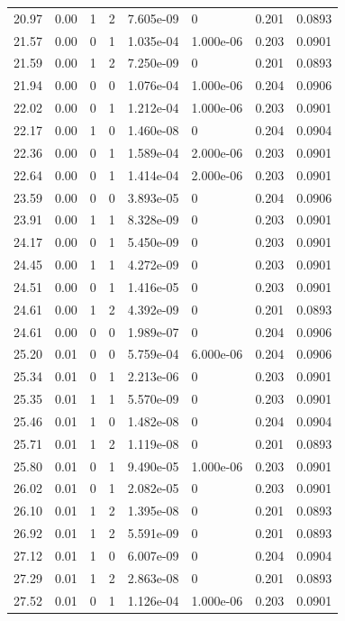 \documentclass[preview]{standalone}
\begin{document}
{{{\begin{tabular}{L{1.2cm}C{1.2cm} C{0.3cm}C{0.5cm} C{1.4cm}C{1.4cm} C{1.4cm}C{1.4cm}}
  20.97  &  0.00  & 1     &  2 &  7.605e-09  & 0  & 0.201 &  0.0893   \\ 
  21.57  &  0.00  & 0     &  1 &  1.035e-04  & 1.000e-06  & 0.203 &  0.0901   \\ 
  21.59  &  0.00  & 1     &  2 &  7.250e-09  & 0  & 0.201 &  0.0893   \\ 
  21.94  &  0.00  & 0     &  0 &  1.076e-04  & 1.000e-06  & 0.204 &  0.0906   \\ 
  22.02  &  0.00  & 0     &  1 &  1.212e-04  & 1.000e-06  & 0.203 &  0.0901   \\ 
  22.17  &  0.00  & 1     &  0 &  1.460e-08  & 0  & 0.204 &  0.0904   \\ 
  22.36  &  0.00  & 0     &  1 &  1.589e-04  & 2.000e-06  & 0.203 &  0.0901   \\ 
  22.64  &  0.00  & 0     &  1 &  1.414e-04  & 2.000e-06  & 0.203 &  0.0901   \\ 
  23.59  &  0.00  & 0     &  0 &  3.893e-05  & 0  & 0.204 &  0.0906   \\ 
  23.91  &  0.00  & 1     &  1 &  8.328e-09  & 0  & 0.203 &  0.0901   \\ 
  24.17  &  0.00  & 0     &  1 &  5.450e-09  & 0  & 0.203 &  0.0901   \\ 
  24.45  &  0.00  & 1     &  1 &  4.272e-09  & 0  & 0.203 &  0.0901   \\ 
  24.51  &  0.00  & 0     &  1 &  1.416e-05  & 0  & 0.203 &  0.0901   \\ 
  24.61  &  0.00  & 1     &  2 &  4.392e-09  & 0  & 0.201 &  0.0893   \\ 
  24.61  &  0.00  & 0     &  0 &  1.989e-07  & 0  & 0.204 &  0.0906   \\ 
  25.20  &  0.01  & 0     &  0 &  5.759e-04  & 6.000e-06  & 0.204 &  0.0906   \\ 
  25.34  &  0.01  & 0     &  1 &  2.213e-06  & 0  & 0.203 &  0.0901   \\ 
  25.35  &  0.01  & 1     &  1 &  5.570e-09  & 0  & 0.203 &  0.0901   \\ 
  25.46  &  0.01  & 1     &  0 &  1.482e-08  & 0  & 0.204 &  0.0904   \\ 
  25.71  &  0.01  & 1     &  2 &  1.119e-08  & 0  & 0.201 &  0.0893   \\ 
  25.80  &  0.01  & 0     &  1 &  9.490e-05  & 1.000e-06  & 0.203 &  0.0901   \\ 
  26.02  &  0.01  & 0     &  1 &  2.082e-05  & 0  & 0.203 &  0.0901   \\ 
  26.10  &  0.01  & 1     &  2 &  1.395e-08  & 0  & 0.201 &  0.0893   \\ 
  26.92  &  0.01  & 1     &  2 &  5.591e-09  & 0  & 0.201 &  0.0893   \\ 
  27.12  &  0.01  & 1     &  0 &  6.007e-09  & 0  & 0.204 &  0.0904   \\ 
  27.29  &  0.01  & 1     &  2 &  2.863e-08  & 0  & 0.201 &  0.0893   \\ 
  27.52  &  0.01  & 0     &  1 &  1.126e-04  & 1.000e-06  & 0.203 &  0.0901   \\ 
\hline 
\end{tabular} 

}}}
\end{document}

